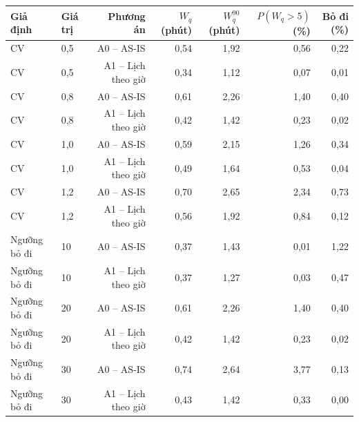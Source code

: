 \begin{tabular}{llrrrrr}
\toprule
\textbf{Giả định} & \textbf{Giá trị} & \textbf{Phương án} & \textbf{$W_q$ (phút)} & \textbf{$W_q^{90}$ (phút)} & \textbf{$P(W_q{>}5)$ (\%)} & \textbf{Bỏ đi (\%)} \\
\midrule
CV & 0{,}5 & A0 – AS-IS & 0{,}54 & 1{,}92 & 0{,}56 & 0{,}22 \\
CV & 0{,}5 & A1 – Lịch theo giờ & 0{,}34 & 1{,}12 & 0{,}07 & 0{,}01 \\
CV & 0{,}8 & A0 – AS-IS & 0{,}61 & 2{,}26 & 1{,}40 & 0{,}40 \\
CV & 0{,}8 & A1 – Lịch theo giờ & 0{,}42 & 1{,}42 & 0{,}23 & 0{,}02 \\
CV & 1{,}0 & A0 – AS-IS & 0{,}59 & 2{,}15 & 1{,}26 & 0{,}34 \\
CV & 1{,}0 & A1 – Lịch theo giờ & 0{,}49 & 1{,}64 & 0{,}53 & 0{,}04 \\
CV & 1{,}2 & A0 – AS-IS & 0{,}70 & 2{,}65 & 2{,}34 & 0{,}73 \\
CV & 1{,}2 & A1 – Lịch theo giờ & 0{,}56 & 1{,}92 & 0{,}84 & 0{,}12 \\
Ngưỡng bỏ đi & 10 & A0 – AS-IS & 0{,}37 & 1{,}43 & 0{,}01 & 1{,}22 \\
Ngưỡng bỏ đi & 10 & A1 – Lịch theo giờ & 0{,}37 & 1{,}27 & 0{,}03 & 0{,}47 \\
Ngưỡng bỏ đi & 20 & A0 – AS-IS & 0{,}61 & 2{,}26 & 1{,}40 & 0{,}40 \\
Ngưỡng bỏ đi & 20 & A1 – Lịch theo giờ & 0{,}42 & 1{,}42 & 0{,}23 & 0{,}02 \\
Ngưỡng bỏ đi & 30 & A0 – AS-IS & 0{,}74 & 2{,}64 & 3{,}77 & 0{,}13 \\
Ngưỡng bỏ đi & 30 & A1 – Lịch theo giờ & 0{,}43 & 1{,}42 & 0{,}33 & 0{,}00 \\
\bottomrule
\end{tabular}

